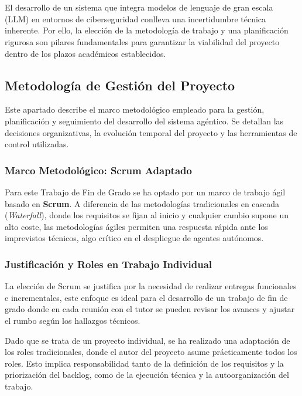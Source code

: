\chapter{\methodologyname} \label{cap:metodologia}

El desarrollo de un sistema que integra modelos de lenguaje de gran escala (LLM) en entornos de ciberseguridad conlleva una incertidumbre técnica inherente. Por ello, la elección de la metodología de trabajo y una planificación rigurosa son pilares fundamentales para garantizar la viabilidad del proyecto dentro de los plazos académicos establecidos.

\section{Metodología de Gestión del Proyecto}
\label{sec:metodologia_gestion}

Este apartado describe el marco metodológico empleado para la gestión, planificación y seguimiento del desarrollo del sistema agéntico. Se detallan las decisiones organizativas, la evolución temporal del proyecto y las herramientas de control utilizadas.

\subsection{Marco Metodológico: Scrum Adaptado}

Para este Trabajo de Fin de Grado se ha optado por un marco de trabajo ágil basado en \textbf{Scrum}. A diferencia de las metodologías tradicionales en cascada (\textit{Waterfall}), donde los requisitos se fijan al inicio y cualquier cambio supone un alto coste, las metodologías ágiles permiten una respuesta rápida ante los imprevistos técnicos, algo crítico en el despliegue de agentes autónomos.

\subsection{Justificación y Roles en Trabajo Individual}

La elección de Scrum se justifica por la necesidad de realizar entregas funcionales e incrementales, este enfoque es ideal para el desarrollo de un trabajo de fin de grado donde en cada reunión con el tutor se pueden revisar los avances y ajustar el rumbo según los hallazgos técnicos.

Dado que se trata de un proyecto individual, se ha realizado una adaptación de los roles tradicionales, donde el autor del proyecto asume prácticamente todos los roles. Esto implica responsabilidad tanto de la definición de los requisitos y la priorización del backlog, como de la ejecución técnica y la autoorganización del trabajo.


